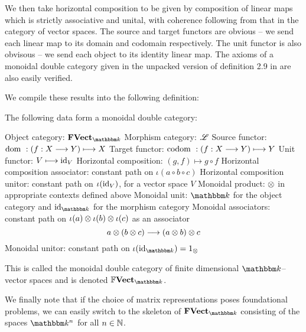 \documentclass[./Thick_TQFTs_and_Quantum_Information.tex]{subfiles}
\begin{document}
We then take horizontal composition to be given by composition of linear maps
which is strictly associative and unital, with coherence following from that in
the category of vector spaces. The source and target functors are obvious -- we
send each linear map to its domain and codomain respectively. The unit functor
is also obvisous -- we send each object to its identity linear map.
The axioms of a monoidal double category given in the unpacked version of
definition 2.9 in \cite[5]{SymMonBicat} are also easily verified.


We compile these results into the following definition:
\begin{defn}
The following data form a monoidal double category:
\begin{enmrt}
\li Object category: $\FVect_{\K}$
\li Morphism category: $\mathscr{L}$
\li Source functor: $\text{dom } : (f : X \stackrel{}{\longrightarrow} Y) \longmapsto X$
\li Target functor: $\text{codom } : (f : X \stackrel{}{\longrightarrow} Y) \longmapsto Y$
\li Unit functor: $V \longmapsto \text{id}_V$
\li Horizontal composition: $(g, f) \mapsto g \circ f$
\li Horizontal composition associator: constant path on
$\iota(a \circ b \circ c)$
\li Horizontal composition unitor: constant path on $\iota(\text{id}_V)$, for a vector
space $V$
\li Monoidal product: $\otimes$ in appropriate contexts defined above
\li Monoidal unit: $\K$ for the object category and $\id_{\K}$ for the morphism
category
\li Monoidal associators: constant path on
$\iota(a) \otimes \iota(b) \otimes \iota(c)$ as an associator
\[
  a \otimes (b \otimes c) \stackrel{}{\longrightarrow} (a \otimes b) \otimes c
\]
\li Monoidal unitor: constant path on $\iota(\id_{\K}) = 1_{\tensor}$
\end{enmrt}
This is called the monoidal double category of finite dimensional $\K$--vector
spaces and is denoted $\FFVect_{\K}$.
\end{defn}

We finally note that if the choice of matrix representations poses foundational
problems, we can easily switch to the skeleton of $\FVect_{\K}$ consisting of
the spaces $\K^n$ for all $n \in \mathbb{N}$.

%
%
%
\end{document}
